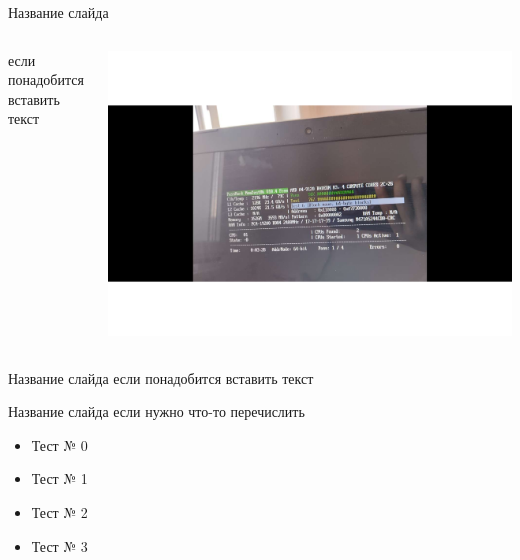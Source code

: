 \documentclass{beamer}
\begin{document}
\begin{frame}{Название слайда}
    \begin{columns}[T]
        \begin{column}{0.5\textwidth}
           если понадобится вставить текст
        \end{column}
        \begin{column}{0.5\textwidth} 
            \includegraphics[width=\textwidth]{images/MemTest.pdf}
        \end{column}
    \end{columns}
\end{frame}
\begin{frame}{Название слайда}
    если понадобится вставить текст
\end{frame}
\begin{frame}{Название слайда}
    если нужно что-то перечислить
   \begin{itemize}
       \item Тест № 0
        \item Тест № 1 
        \item Тест № 2 
        \item Тест № 3  
   \end{itemize}
\end{frame}
\end{document}
